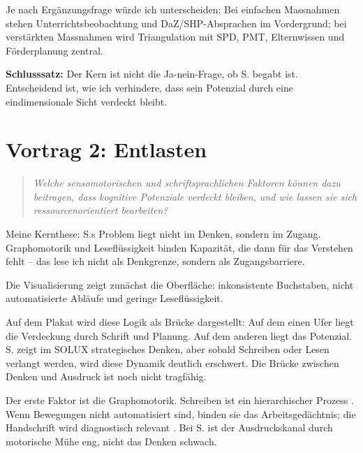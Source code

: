 \documentclass[ngerman, a4paper]{article}
\begin{document}
Je nach Ergänzungsfrage würde ich unterscheiden: Bei einfachen Massnahmen
stehen Unterrichtsbeobachtung und DaZ/SHP-Absprachen im Vordergrund; bei
verstärkten Massnahmen wird Triangulation mit SPD, PMT, Elternwissen und
Förderplanung zentral.

\textbf{Schlusssatz:} Der Kern ist nicht die Ja-nein-Frage, ob S. begabt ist.
Entscheidend ist, wie ich verhindere, dass sein Potenzial durch eine
eindimensionale Sicht verdeckt bleibt.

\newpage

\section{Vortrag 2: Entlasten}
\label{sec:vortrag2}

\begin{quote}\itshape
Welche sensomotorischen und schriftsprachlichen Faktoren können dazu beitragen,
dass kognitive Potenziale verdeckt bleiben, und wie lassen sie sich
ressourcenorientiert bearbeiten?
\end{quote}

Meine Kernthese: S.s Problem liegt nicht im Denken, sondern im Zugang.
Graphomotorik und Leseflüssigkeit binden Kapazität, die dann für das Verstehen
fehlt -- das lese ich nicht als Denkgrenze, sondern als Zugangsbarriere.

Die Visualisierung zeigt zunächst die Oberfläche: inkonsistente Buchstaben,
nicht automatisierte Abläufe und geringe Leseflüssigkeit.

Auf dem Plakat wird diese Logik als Brücke dargestellt: Auf dem einen Ufer liegt
die Verdeckung durch Schrift und Planung. Auf dem anderen liegt das Potenzial.
S. zeigt im SOLUX strategisches Denken, aber sobald Schreiben oder Lesen
verlangt werden, wird diese Dynamik deutlich erschwert. Die Brücke zwischen
Denken und Ausdruck ist noch nicht tragfähig.

Der erste Faktor ist die Graphomotorik. Schreiben ist ein hierarchischer
Prozess \parencite{nottbusch2017graphomotorik}. Wenn Bewegungen nicht
automatisiert sind, binden sie das Arbeitsgedächtnis; die Handschrift wird
diagnostisch relevant \parencite{hurschler2020handschriftbeurteilung}. Bei S.
ist der Ausdruckskanal durch motorische Mühe eng, nicht das Denken schwach.
\end{document}
